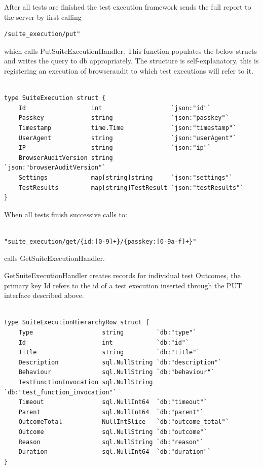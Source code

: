 After all tests are finished the test execution framework sends the full report to the server by first calling  
\begin{verbatim}
/suite_execution/put"
\end{verbatim}

which calls PutSuiteExecutionHandler. This function populates the below structs and writes the query to db appropriately.
The structure is self-explanatory, this is registering an execution of browseraudit to which test executions will refer to it.

\begin{verbatim}

type SuiteExecution struct {
	Id                  int                   `json:"id"`
	Passkey             string                `json:"passkey"`
	Timestamp           time.Time             `json:"timestamp"`
	UserAgent           string                `json:"userAgent"`
	IP                  string                `json:"ip"`
	BrowserAuditVersion string                `json:"browserAuditVersion"`
	Settings            map[string]string     `json:"settings"`
	TestResults         map[string]TestResult `json:"testResults"`
}

\end{verbatim}

When all tests finish successive calls to:

\begin{verbatim}

"suite_execution/get/{id:[0-9]+}/{passkey:[0-9a-f]+}" 

\end{verbatim}
calls GetSuiteExecutionHandler.

GetSuiteExecutionHandler creates records for individual test Outcomes, the primary key Id refers to the id of a test execution
inserted through the PUT interface described above.

\begin{verbatim}

type SuiteExecutionHierarchyRow struct {
	Type                   string         `db:"type"`
	Id                     int            `db:"id"`
	Title                  string         `db:"title"`
	Description            sql.NullString `db:"description"`
	Behaviour              sql.NullString `db:"behaviour"`
	TestFunctionInvocation sql.NullString `db:"test_function_invocation"`
	Timeout                sql.NullInt64  `db:"timeout"`
	Parent                 sql.NullInt64  `db:"parent"`
	OutcomeTotal           NullIntSlice   `db:"outcome_total"`
	Outcome                sql.NullString `db:"outcome"`
	Reason                 sql.NullString `db:"reason"`
	Duration               sql.NullInt64  `db:"duration"`
}

\end{verbatim}


